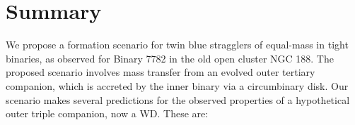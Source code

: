 \documentclass{aastex62}
\begin{document}

\section{Summary} \label{sect:conclusions}

We propose a formation scenario for twin blue stragglers of equal-mass
in tight binaries, as observed for Binary 7782 in the old open cluster
NGC 188.  The proposed scenario involves mass transfer from an evolved
outer tertiary companion, which is accreted by the inner binary via a
circumbinary disk.  Our scenario makes several predictions for the
observed properties of a hypothetical outer triple companion, now a
WD.  These are:
\end{document}
